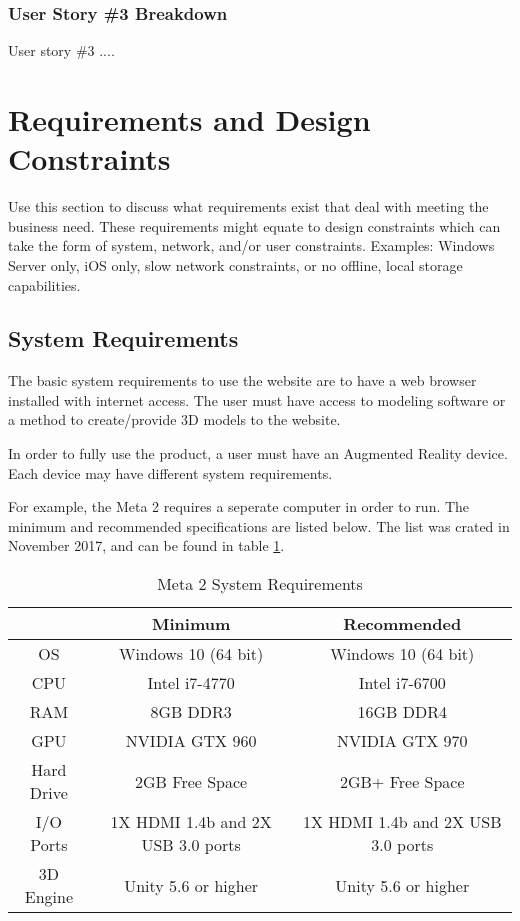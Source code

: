 \subsubsection{User Story \#3 Breakdown}
User story \#3  ....



\section{Requirements and Design Constraints}
Use this section to discuss what requirements exist that deal with meeting the
business need.  These requirements might equate to design constraints which can
take the form of system, network, and/or user constraints.  Examples:  Windows
Server only, iOS only, slow network constraints, or no offline, local storage capabilities.


\subsection{System  Requirements}

The basic system requirements to use the website are to have a web browser installed with internet access.  The user must have access to modeling software or a method to create/provide 3D models to the website.

In order to fully use the product, a user must have an Augmented Reality device.  Each device may have different system requirements.

For example, the Meta 2 requires a seperate computer in order to run.  The minimum and recommended specifications are listed below.  The list was crated in November 2017, and can be found in table \ref{table:metatwosystemrequirements}.


\begin{table}[H]
	\centering
	\begin{tabular}{ | c | c | c | }
		\hline
		& Minimum & Recommended \\ \hline
		OS & Windows 10 (64 bit) & 	Windows 10 (64 bit) \\ \hline
		CPU & Intel i7-4770 & Intel i7-6700 \\ \hline
		RAM & 8GB DDR3 & 16GB DDR4 \\ \hline
		GPU & NVIDIA GTX 960 & NVIDIA GTX 970 \\ \hline
		Hard Drive & 2GB Free Space & 2GB+ Free Space \\ \hline
		I/O Ports & 1X HDMI 1.4b and 2X USB 3.0 ports & 1X HDMI 1.4b and 2X USB 3.0 ports \\ \hline
		3D Engine & Unity 5.6 or higher & Unity 5.6 or higher \\ \hline
	\end{tabular}

	\caption{Meta 2 System Requirements}
	\label{table:metatwosystemrequirements}
\end{table}

